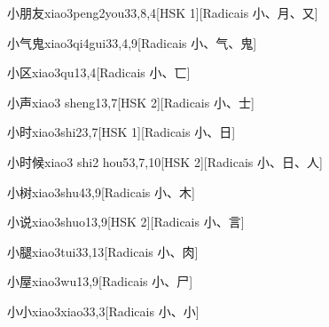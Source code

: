\begin{entry}{小朋友}{xiao3peng2you3}{3,8,4}[HSK 1][Radicais ⼩、⽉、⼜]
\end{entry}

\begin{entry}{小气鬼}{xiao3qi4gui3}{3,4,9}[Radicais ⼩、⽓、⿁]
\end{entry}

\begin{entry}{小区}{xiao3qu1}{3,4}[Radicais ⼩、⼖]
\end{entry}

\begin{entry}{小声}{xiao3 sheng1}{3,7}[HSK 2][Radicais ⼩、⼠]
\end{entry}

\begin{entry}{小时}{xiao3shi2}{3,7}[HSK 1][Radicais ⼩、⽇]
\end{entry}

\begin{entry}{小时候}{xiao3 shi2 hou5}{3,7,10}[HSK 2][Radicais ⼩、⽇、⼈]
\end{entry}

\begin{entry}{小树}{xiao3shu4}{3,9}[Radicais ⼩、⽊]
\end{entry}

\begin{entry}{小说}{xiao3shuo1}{3,9}[HSK 2][Radicais ⼩、⾔]
\end{entry}

\begin{entry}{小腿}{xiao3tui3}{3,13}[Radicais ⼩、⾁]
\end{entry}

\begin{entry}{小屋}{xiao3wu1}{3,9}[Radicais ⼩、⼫]
\end{entry}

\begin{entry}{小小}{xiao3xiao3}{3,3}[Radicais ⼩、⼩]
\end{entry}

